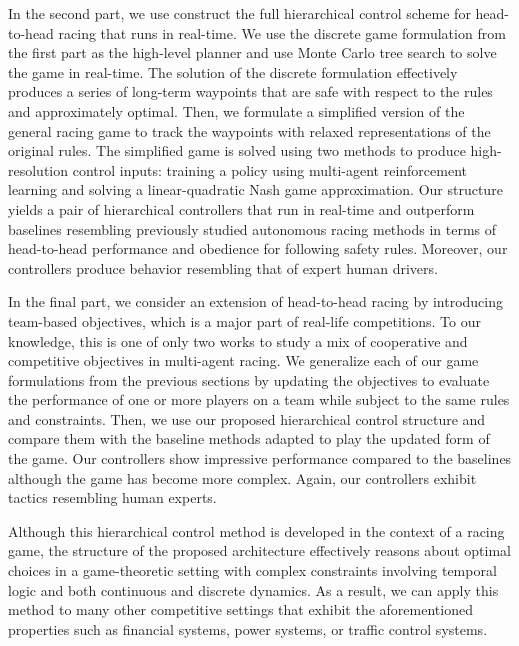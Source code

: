 In the second part, we use construct the full hierarchical control scheme for head-to-head racing that runs in real-time. We use the discrete game formulation from the first part as the high-level planner and use Monte Carlo tree search to solve the game in real-time. The solution of the discrete formulation effectively produces a series of long-term waypoints that are safe with respect to the rules and approximately optimal. Then, we formulate a simplified version of the general racing game to track the waypoints with relaxed representations of the original rules. The simplified game is solved using two methods to produce high-resolution control inputs: training a policy using multi-agent reinforcement learning and solving a linear-quadratic Nash game approximation. Our structure yields a pair of hierarchical controllers that run in real-time and outperform baselines resembling previously studied autonomous racing methods in terms of head-to-head performance and obedience for following safety rules. Moreover, our controllers produce behavior resembling that of expert human drivers. 

In the final part, we consider an extension of head-to-head racing by introducing team-based objectives, which is a major part of real-life competitions. To our knowledge, this is one of only two works to study a mix of cooperative and competitive objectives in multi-agent racing. We generalize each of our game formulations from the previous sections by updating the objectives to evaluate the performance of one or more players on a team while subject to the same rules and constraints. Then, we use our proposed hierarchical control structure and compare them with the baseline methods adapted to play the updated form of the game. Our controllers show impressive performance compared to the baselines although the game has become more complex. Again, our controllers exhibit tactics resembling human experts.

Although this hierarchical control method is developed in the context of a racing game, the structure of the proposed architecture effectively reasons about optimal choices in a game-theoretic setting with complex constraints involving temporal logic and both continuous and discrete dynamics. As a result, we can apply this method to many other competitive settings that exhibit the aforementioned properties such as financial systems, power systems, or traffic control systems.

